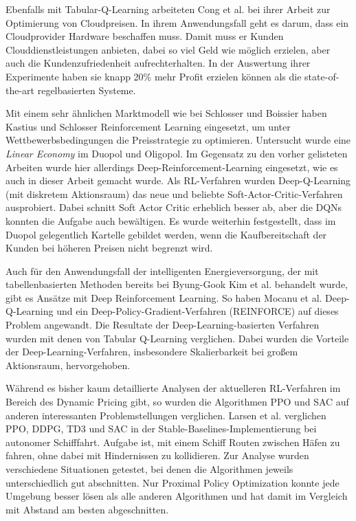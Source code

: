 Ebenfalls mit Tabular-Q-Learning arbeiteten Cong et al. bei ihrer Arbeit zur Optimierung von Cloudpreisen. \cite{9086147}
In ihrem Anwendungsfall geht es darum, dass ein Cloudprovider Hardware beschaffen muss.
Damit muss er Kunden Clouddienstleistungen anbieten, dabei so viel Geld wie möglich erzielen, aber auch die Kundenzufriedenheit aufrechterhalten.
In der Auswertung ihrer Experimente haben sie knapp 20\% mehr Profit erzielen können als die state-of-the-art regelbasierten Systeme.

Mit einem sehr ähnlichen Marktmodell wie bei Schlosser und Boissier haben Kastius und Schlosser Reinforcement Learning eingesetzt, um unter Wettbewerbsbedingungen die Preisstrategie zu optimieren. \cite{Kastius2022}
Untersucht wurde eine \textit{Linear Economy} im Duopol und Oligopol.
Im Gegensatz zu den vorher gelisteten Arbeiten wurde hier allerdings Deep-Reinforcement-Learning eingesetzt, wie es auch in dieser Arbeit gemacht wurde.
Als RL-Verfahren wurden Deep-Q-Learning (mit diskretem Aktionsraum) das neue und beliebte Soft-Actor-Critic-Verfahren ausprobiert.
Dabei schnitt Soft Actor Critic erheblich besser ab, aber die DQNs konnten die Aufgabe auch bewältigen.
Es wurde weiterhin festgestellt, dass im Duopol gelegentlich Kartelle gebildet werden, wenn die Kaufbereitschaft der Kunden bei höheren Preisen nicht begrenzt wird.

Auch für den Anwendungsfall der intelligenten Energieversorgung, der mit tabellenbasierten Methoden bereits bei Byung-Gook Kim et al. behandelt wurde, gibt es Ansätze mit Deep Reinforcement Learning.
So haben Mocanu et al. Deep-Q-Learning und ein Deep-Policy-Gradient-Verfahren (REINFORCE) auf dieses Problem angewandt.
Die Resultate der Deep-Learning-basierten Verfahren wurden mit denen von Tabular Q-Learning verglichen.
Dabei wurden die Vorteile der Deep-Learning-Verfahren, insbesondere Skalierbarkeit bei großem Aktionsraum, hervorgehoben.

Während es bisher kaum detaillierte Analysen der aktuelleren RL-Verfahren im Bereich des Dynamic Pricing gibt, so wurden die Algorithmen PPO und SAC auf anderen interessanten Problemstellungen verglichen.
Larsen et al. verglichen PPO, DDPG, TD3 und SAC in der Stable-Baselines-Implementierung bei autonomer Schifffahrt.
Aufgabe ist, mit einem Schiff Routen zwischen Häfen zu fahren, ohne dabei mit Hindernissen zu kollidieren.
Zur Analyse wurden verschiedene Situationen getestet, bei denen die Algorithmen jeweils unterschiedlich gut abschnitten.
Nur Proximal Policy Optimization konnte jede Umgebung besser lösen als alle anderen Algorithmen und hat damit im Vergleich mit Abstand am besten abgeschnitten.

